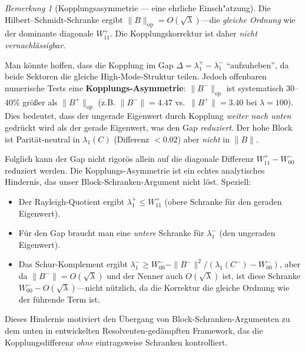 ﻿\documentclass[12pt,a4paper]{article}
\theoremstyle{definition}
\theoremstyle{remark}
\newtheorem{remark}[theorem]{Bemerkung}
\begin{document}
\begin{remark}[Kopplungsasymmetrie --- eine ehrliche Einsch"atzung]
\label{rem:coupling-revisited}
Die Hilbert--Schmidt-Schranke ergibt $\|B\|_{\mathrm{op}} = O(\sqrt{\lambda})$---die \emph{gleiche Ordnung} wie der dominante diagonale $W_{11}^+$. Die Kopplungskorrektur ist daher \emph{nicht vernachlässigbar}.

Man könnte hoffen, dass die Kopplung im Gap $\Delta = \lambda_1^+ - \lambda_1^-$ ``aufzuheben'', da beide Sektoren die gleiche High-Mode-Struktur teilen. Jedoch offenbaren numerische Tests eine \textbf{Kopplungs-Asymmetrie}: $\|B^-\|_{\mathrm{op}}$ ist systematisch $30$--$40\%$ größer als $\|B^+\|_{\mathrm{op}}$ (z.B. $\|B^-\| = 4.47$ vs.\ $\|B^+\| = 3.40$ bei $\lambda = 100$). Dies bedeutet, dass der ungerade Eigenwert durch Kopplung \emph{weiter nach unten} gedrückt wird als der gerade Eigenwert, was den Gap \emph{reduziert}. Der hohe Block ist Parität-neutral in $\lambda_1(C)$ (Differenz $< 0.02$) aber \emph{nicht} in $\|B\|$.

Folglich kann der Gap nicht rigorös allein auf die diagonale Differenz $W_{11}^+ - W_{00}^-$ reduziert werden. Die Kopplungs-Asymmetrie ist ein echtes analytisches Hindernis, das unser Block-Schranken-Argument nicht löst. Speziell:
\begin{itemize}
  \item Der Rayleigh-Quotient ergibt $\lambda_1^+ \leq W_{11}^+$ (obere Schranke für den geraden Eigenwert).
  \item Für den Gap braucht man eine \emph{untere} Schranke für $\lambda_1^-$ (den ungeraden Eigenwert).
  \item Das Schur-Komplement ergibt $\lambda_1^- \geq W_{00}^- - \|B^-\|^2/(\lambda_1(C^-) - W_{00}^-)$, aber da $\|B^-\| = O(\sqrt{\lambda})$ und der Nenner auch $O(\sqrt{\lambda})$ ist, ist diese Schranke $W_{00}^- - O(\sqrt{\lambda})$---nicht nützlich, da die Korrektur die gleiche Ordnung wie der führende Term ist.
\end{itemize}
Dieses Hindernis motiviert den Übergang von Block-Schranken-Argumenten zu dem unten in  entwickelten Resolventen-gedämpften Framework, das die Kopplungsdifferenz \emph{ohne} eintragsweise Schranken kontrolliert.
\end{remark}
\end{document}

